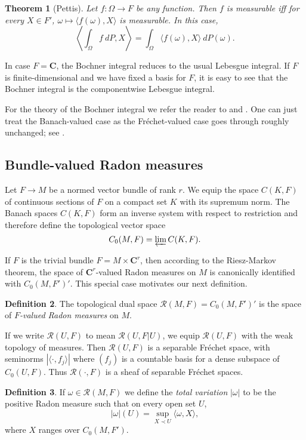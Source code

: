 \documentclass[reqno,12pt,letterpaper]{amsart}
\newcommand{\CC}{\mathbf{C}}
\newcommand{\dfn}[1]{\emph{#1}\index{#1}}
\newtheorem{theorem}{Theorem}[section]
\theoremstyle{definition}
\newtheorem{definition}[theorem]{Definition}
\numberwithin{equation}{section}
\begin{document}
\begin{theorem}[Pettis]
Let $f: \Omega \to F$ be any function.
Then $f$ is measurable iff for every $X \in F'$, $\omega \mapsto \langle f(\omega), X\rangle$ is measurable.
In this case,
$$\left\langle \int_\Omega f ~dP, X\right\rangle = \int_\Omega \langle f(\omega), X\rangle ~dP(\omega).$$
\end{theorem}

In case $F = \CC$, the Bochner integral reduces to the usual Lebesgue integral.
If $F$ is finite-dimensional and we have fixed a basis for $F$, it is easy to see that the Bochner integral is the componentwise Lebesgue integral.

For the theory of the Bochner integral we refer the reader to \cite{Rieffel70} and \cite[Chapter V]{yosida2012functional}.
One can just treat the Banach-valued case as the Fr\'echet-valued case goes through roughly unchanged; see \cite{MO47721}.

\subsection{Bundle-valued Radon measures}
Let $F \to M$ be a normed vector bundle of rank $r$.
We equip the space $C(K, F)$ of continuous sections of $F$ on a compact set $K$ with its supremum norm.
The Banach spaces $C(K, F)$ form an inverse system with respect to restriction and therefore define the topological vector space
$$C_0(M, F) = \varprojlim C(K, F).$$

If $F$ is the trivial bundle $F = M \times \CC^r$, then according to the Riesz-Markov theorem, the space of $\CC^r$-valued Radon measures on $M$ is canonically identified with $C_0(M, F')'$.
This special case motivates our next definition.

\begin{definition}
The topological dual space $\mathcal R(M, F) = C_0(M, F')'$ is the space of \dfn{$F$-valued Radon measures} on $M$.
\end{definition}

If we write $\mathcal R(U, F)$ to mean $\mathcal R(U, F|U)$, we equip $\mathcal R(U, F)$ with the weak topology of measures.
Then $\mathcal R(U, F)$ is a separable Fr\'echet space, with seminorms $|\langle \cdot, f_j\rangle|$ where $(f_j)$ is a countable basis for a dense subspace of $C_0(U, F)$.
Thus $\mathcal R(\cdot, F)$ is a sheaf of separable Fr\'echet spaces.

\begin{definition}
If $\omega \in \mathcal R(M, F)$ we define the \dfn{total variation} $|\omega|$ to be the positive Radon measure such that on every open set $U$,
$$|\omega|(U) = \sup_{X \prec U} \langle \omega, X\rangle,$$
where $X$ ranges over $C_0(M, F')$.
\end{definition}
\end{document}
